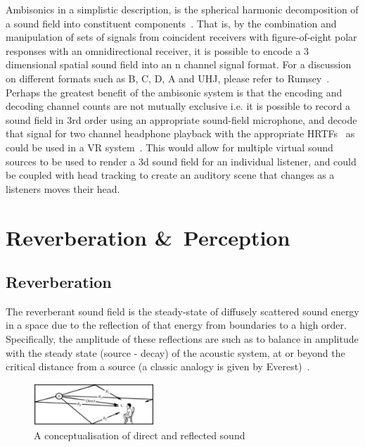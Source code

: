 \documentclass[paper=a4, fontsize=10pt, font=arial]{scrartcl} %
\numberwithin{equation}{section} %
\numberwithin{figure}{section} %
\numberwithin{table}{section} %
\begin{document}
Ambisonics in a simplistic description, is the spherical harmonic decomposition of a sound field into constituent components~\cite{rumsey2012spatial}. 
That is, by the combination and manipulation of  sets of signals from coincident receivers with figure-of-eight polar responses with an omnidirectional receiver, it is possible to encode a 3 dimensional spatial sound field into an n channel signal format. 
For a discussion on different formats such as B, C, D, A and UHJ, please refer to Rumsey~\cite{rumsey2012spatial}. 
Perhaps the greatest benefit of the ambisonic system is that the encoding and decoding channel counts are not mutually exclusive i.e. it is possible to record a sound field in 3rd order using an appropriate sound-field microphone, and decode that signal for two channel headphone playback with the appropriate HRTFs~\cite{Jot1998} as could be used in a VR system~\cite{Collins2013}. This would allow for multiple virtual sound sources to be used to render a 3d sound field for an individual listener, and could be coupled with head tracking to create an auditory scene that changes as a listeners moves their head.\
\newpage
\section{Reverberation \&\ Perception}
\subsection{Reverberation}

The reverberant sound field is the steady-state of diffusely scattered sound energy in a space due to the reflection of that energy from boundaries to a high order. 
Specifically, the amplitude of these reflections are such as to balance in amplitude with the steady state (source - decay) of the acoustic system, at or beyond the critical distance from a source (a classic analogy is given by Everest)~\cite{Everest2009}. 

\begin{figure}[H]
\centering
\includegraphics[width=0.4\textwidth]{reflection_diagran.jpg}
\centering
\caption{A conceptualisation of direct and reflected sound~\cite{Everest2009}}
\end{figure}
\end{document}
